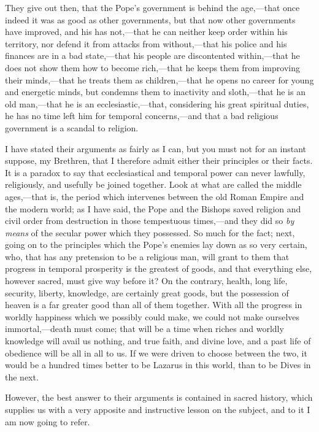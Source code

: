 They give out then, that the Pope's government is
behind the age,—that once indeed it was as good as
other governments, but that now other governments have
improved, and his has not,—that he can neither keep
order within his territory, nor defend it from attacks
from without,—that his police and his finances are
in a bad state,—that his people are discontented
within,—that he does not show them how to become
rich,—that he keeps them from improving their
minds,—that he treats them as children,—that he
opens no career for young and energetic minds, but
condemns them to inactivity and sloth,—that he is an
old man,—that he is an ecclesiastic,—that,
considering his great spiritual duties, he has no time
left him for temporal concerns,—and that a bad
religious government is a scandal to religion.

I have stated their arguments as fairly as I can, but
you must not for an instant suppose, my Brethren, that I
therefore admit either their principles or their facts.
It is a paradox to say that ecclesiastical and temporal
power can never lawfully, religiously, and usefully be
joined together. Look at what are called the middle
ages,—that is, the period which intervenes between
the old Roman Empire and the modern world; as I have
said, the Pope and the Bishops saved religion and civil
order from destruction in those tempestuous
times,—and they did so \emph{by means} of the
secular power which they possessed. So much for the fact;
next, going on to the principles which the Pope's enemies
lay down as so very certain, who, that has any pretension
to be a religious man, will grant to them that progress
in temporal prosperity is the greatest of goods, and that
everything else, however sacred, must give way before it?
On the contrary, health, long life, security, liberty,
knowledge, are certainly great goods, but the possession
of heaven is a far greater good than all of them
together. With all the progress in worldly happiness
which we possibly could make, we could not make ourselves
immortal,—death must come; that will be a time when
riches and worldly knowledge will avail us nothing, and
true faith, and divine love, and a past life of obedience
will be all in all to us. If we were driven to choose
between the two, it would be a hundred times better to be
Lazarus in this world, than to be Dives in the next.

However, the best answer to their arguments is
contained in sacred history, which supplies us with a
very apposite and instructive lesson on the subject, and
to it I am now going to refer.

